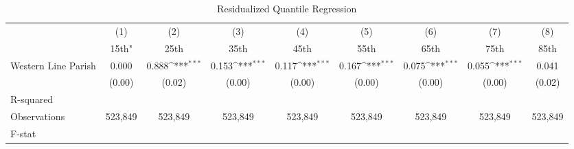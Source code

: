 \begin{table}[htbp]\centering
\def\sym#1{\ifmmode^{#1}\else\(^{#1}\)\fi}
\caption{Residualized Quantile Regression}
\begin{tabular}{l*{8}{c}}
\hline\hline
                    &\multicolumn{1}{c}{(1)}&\multicolumn{1}{c}{(2)}&\multicolumn{1}{c}{(3)}&\multicolumn{1}{c}{(4)}&\multicolumn{1}{c}{(5)}&\multicolumn{1}{c}{(6)}&\multicolumn{1}{c}{(7)}&\multicolumn{1}{c}{(8)}\\
                    &\multicolumn{1}{c}{15th"}&\multicolumn{1}{c}{25th}&\multicolumn{1}{c}{35th}&\multicolumn{1}{c}{45th}&\multicolumn{1}{c}{55th}&\multicolumn{1}{c}{65th}&\multicolumn{1}{c}{75th}&\multicolumn{1}{c}{85th}\\
\hline
Western Line Parish &       0.000         &       0.888\sym{***}&       0.153\sym{***}&       0.117\sym{***}&       0.167\sym{***}&       0.075\sym{***}&       0.055\sym{***}&       0.041         \\
                    &      (0.00)         &      (0.02)         &      (0.00)         &      (0.00)         &      (0.00)         &      (0.00)         &      (0.00)         &      (0.02)         \\
\hline
R-squared           &                     &                     &                     &                     &                     &                     &                     &                     \\
Observations        &     523,849         &     523,849         &     523,849         &     523,849         &     523,849         &     523,849         &     523,849         &     523,849         \\
F-stat              &                     &                     &                     &                     &                     &                     &                     &                     \\
\hline\hline
\end{tabular}
\end{table}
